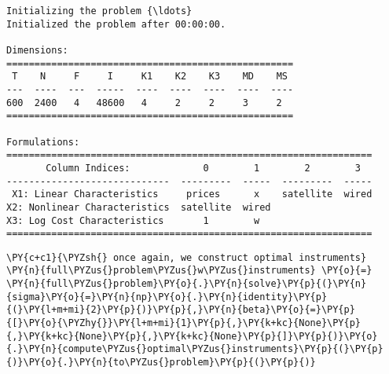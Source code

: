     \begin{Verbatim}[commandchars=\\\{\}]
Initializing the problem {\ldots}
Initialized the problem after 00:00:00.

Dimensions:
===================================================
 T    N     F     I     K1    K2    K3    MD    MS
---  ----  ---  -----  ----  ----  ----  ----  ----
600  2400   4   48600   4     2     2     3     2
===================================================

Formulations:
=================================================================
       Column Indices:             0        1        2        3
-----------------------------  ---------  -----  ---------  -----
 X1: Linear Characteristics     prices      x    satellite  wired
X2: Nonlinear Characteristics  satellite  wired
X3: Log Cost Characteristics       1        w
=================================================================
    \end{Verbatim}

    \begin{tcolorbox}[breakable, size=fbox, boxrule=1pt, pad at break*=1mm,colback=cellbackground, colframe=cellborder]
\begin{Verbatim}[commandchars=\\\{\}]
\PY{c+c1}{\PYZsh{} once again, we construct optimal instruments}
\PY{n}{full\PYZus{}problem\PYZus{}w\PYZus{}instruments} \PY{o}{=} \PY{n}{full\PYZus{}problem}\PY{o}{.}\PY{n}{solve}\PY{p}{(}\PY{n}{sigma}\PY{o}{=}\PY{n}{np}\PY{o}{.}\PY{n}{identity}\PY{p}{(}\PY{l+m+mi}{2}\PY{p}{)}\PY{p}{,}\PY{n}{beta}\PY{o}{=}\PY{p}{[}\PY{o}{\PYZhy{}}\PY{l+m+mi}{1}\PY{p}{,}\PY{k+kc}{None}\PY{p}{,}\PY{k+kc}{None}\PY{p}{,}\PY{k+kc}{None}\PY{p}{]}\PY{p}{)}\PY{o}{.}\PY{n}{compute\PYZus{}optimal\PYZus{}instruments}\PY{p}{(}\PY{p}{)}\PY{o}{.}\PY{n}{to\PYZus{}problem}\PY{p}{(}\PY{p}{)}
\end{Verbatim}
\end{tcolorbox}

